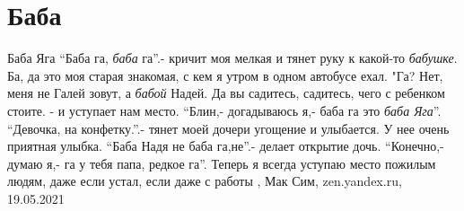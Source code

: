  
 
 
 
 
\chapter{Баба}

Баба Яга
\enquote{Баба га, \emph{баба} га}.- кричит моя мелкая и тянет руку к какой-то \emph{бабушке}.
Ба, да это моя старая знакомая, с кем я утром в одном автобусе ехал.
"Га? Нет, меня не Галей зовут, а \emph{бабой} Надей. Да вы садитесь, садитесь, чего с ребенком стоите. - и уступает нам место.
\enquote{Блин,- догадываюсь я,- баба га это \emph{баба Яга}}.
\enquote{Девочка, на конфетку.}.- тянет моей дочери угощение и улыбается. У нее очень приятная улыбка.
\enquote{Баба Надя не баба га,не}.- делает открытие дочь.
\enquote{Конечно,- думаю я,- га у тебя папа, редкое га}.
Теперь я всегда уступаю место пожилым людям, даже если устал, если даже с работы
, Мак Сим, zen.yandex.ru, 19.05.2021

